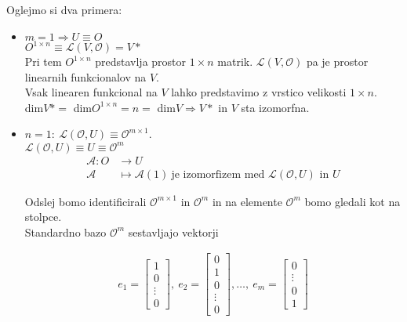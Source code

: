 \documentclass[a4paper,12pt]{article}
\newcommand{\OO}{\mathcal{O}}
\begin{document}
Oglejmo si dva primera:
\begin{itemize}
	\item $m=1 \Rightarrow U \equiv O$ \\
	
	$O^{1\times n} \equiv \mathcal{L}(V,\OO)=V*$ \\

	Pri tem $O^{1\times n}$ predstavlja prostor $1\times n$ matrik. $\mathcal{L}(V,\OO)$ pa je prostor linearnih \linebreak funkcionalov na $V$.\\

	Vsak linearen funkcional na $V$ lahko predstavimo z vrstico velikosti $1\times n$. \\

	dim$V*=$ dim$O^{1\times n}= n =$ dim$V\Rightarrow V*$ in $V$ sta izomorfna. \\

	\item $n=1:~\mathcal{L}(\OO,U)\equiv {\OO}^{m\times 1}$. \\
	
	$\mathcal{L}(\OO,U)\equiv U \equiv \mathcal{O}^m$ 
	\begin{align*}
	\mathcal{A}: O &\to U \\
	\mathcal{A} & \mapsto \mathcal{A}(1)~ \text{je izomorfizem med $\mathcal{L}(\OO,U)$ in $U$}
	\end{align*}

	Odslej bomo identificirali $\OO^{m\times 1}$ in $\mathcal{O}^m$ in na elemente $\mathcal{O}^m$ bomo gledali kot na stolpce. \\

	Standardno bazo $\mathcal{O}^m$ sestavljajo vektorji

	\begin{gather*}
		e_1=
		\begin{bmatrix}
			1 \\
			0 \\
			\vdots \\
			0
		\end{bmatrix}
		,~e_2=
		\begin{bmatrix}
			0 \\
			1 \\
			0 \\
			\vdots \\
			0
		\end{bmatrix}
		,\ldots,~e_m=
		\begin{bmatrix}
			0 \\
			\vdots\\
			0 \\
			1
		\end{bmatrix}
	\end{gather*}
\end{itemize}
\end{document}
